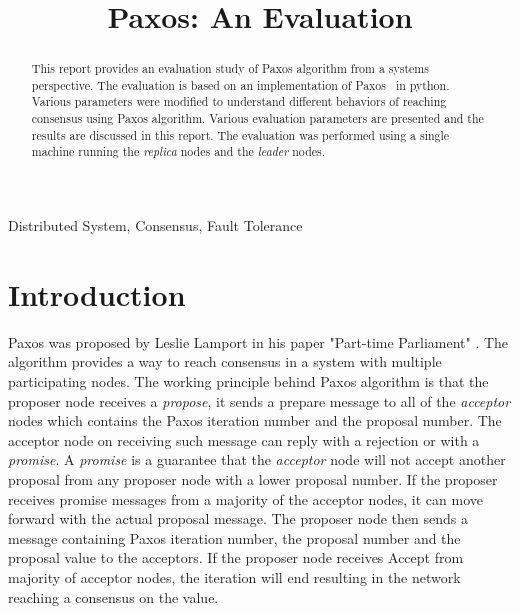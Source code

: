 \documentclass[conference]{IEEEtran}
\begin{document}
\title{Paxos: An Evaluation
}

\author{
}

\maketitle

\begin{abstract}
This report provides an evaluation study of Paxos algorithm from a systems perspective. 
The evaluation is based on an implementation of Paxos~\cite{b3} in python.
Various parameters were modified to understand different behaviors of reaching consensus using Paxos algorithm. 
Various evaluation parameters are presented and the results are discussed in this report. 
The evaluation was performed using a single machine running the \textit{replica} nodes and the \textit{leader} nodes. 
\end{abstract}

\begin{IEEEkeywords}
Distributed System, Consensus, Fault Tolerance
\end{IEEEkeywords}

\section{Introduction}
Paxos was proposed by Leslie Lamport in his paper "Part-time Parliament" \cite{b1}. 
The algorithm provides a way to reach consensus in a system with multiple participating nodes. 
The working principle behind Paxos algorithm is that the proposer node receives a \textit{propose}, it sends a prepare message to all of the \textit{acceptor} nodes which contains the Paxos iteration number and the proposal number. 
The acceptor node on receiving such message can reply with a rejection or with a \textit{promise}. 
A \textit{promise} is a guarantee that the \textit{acceptor} node will not accept another proposal from any proposer node with a lower proposal number. 
If the proposer receives promise messages from a majority of the acceptor nodes, it can move forward with the actual proposal message. 
The proposer node then sends a message containing Paxos iteration number, the proposal number and the proposal value to the acceptors. 
If the proposer node receives Accept from majority of acceptor nodes, the iteration will end resulting in the network reaching a consensus on the value. 
\end{document}
